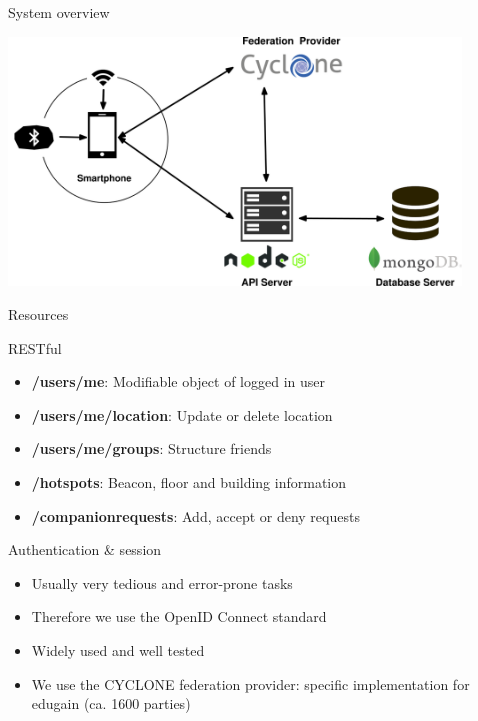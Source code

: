 \documentclass[11pt]{beamer}
\begin{document}
\begin{frame}{System overview}

  \begin{center}
    \includegraphics[width=0.9\textwidth]{architecture_v02}
  \end{center}

\end{frame}


\begin{frame}{Resources}

  RESTful

  \begin{itemize}
    \item \textbf{/users/me}: Modifiable object of logged in user
    \item \textbf{/users/me/location}: Update or delete location
    \item \textbf{/users/me/groups}: Structure friends
    \item \textbf{/hotspots}: Beacon, floor and building information
    \item \textbf{/companionrequests}: Add, accept or deny requests
  \end{itemize}

\end{frame}


\begin{frame}{Authentication \& session}

  \begin{itemize}
    \item Usually very tedious and error-prone tasks
    \item Therefore we use the OpenID Connect standard
    \item Widely used and well tested
    \item We use the CYCLONE federation provider: specific implementation for edugain (ca. 1600 parties)
  \end{itemize}

\end{frame}
\end{document}
